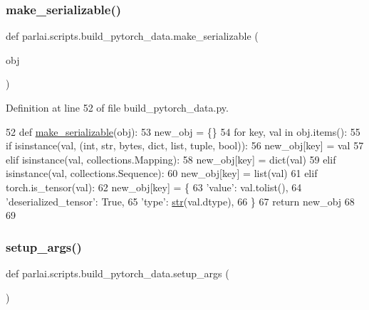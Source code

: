 \subsubsection{\texorpdfstring{make\+\_\+serializable()}{make\_serializable()}}
{\footnotesize\ttfamily def parlai.\+scripts.\+build\+\_\+pytorch\+\_\+data.\+make\+\_\+serializable (\begin{DoxyParamCaption}\item[{}]{obj }\end{DoxyParamCaption})}



Definition at line 52 of file build\+\_\+pytorch\+\_\+data.\+py.


\begin{DoxyCode}
52 \textcolor{keyword}{def }\hyperlink{namespaceparlai_1_1scripts_1_1build__pytorch__data_a1c8f4633b7dc8e990a3e1f6c3e92bd3f}{make\_serializable}(obj):
53     new\_obj = \{\}
54     \textcolor{keywordflow}{for} key, val \textcolor{keywordflow}{in} obj.items():
55         \textcolor{keywordflow}{if} isinstance(val, (int, str, bytes, dict, list, tuple, bool)):
56             new\_obj[key] = val
57         \textcolor{keywordflow}{elif} isinstance(val, collections.Mapping):
58             new\_obj[key] = dict(val)
59         \textcolor{keywordflow}{elif} isinstance(val, collections.Sequence):
60             new\_obj[key] = list(val)
61         \textcolor{keywordflow}{elif} torch.is\_tensor(val):
62             new\_obj[key] = \{
63                 \textcolor{stringliteral}{'value'}: val.tolist(),
64                 \textcolor{stringliteral}{'deserialized\_tensor'}: \textcolor{keyword}{True},
65                 \textcolor{stringliteral}{'type'}: \hyperlink{namespacegenerate__task__READMEs_a5b88452ffb87b78c8c85ececebafc09f}{str}(val.dtype),
66             \}
67     \textcolor{keywordflow}{return} new\_obj
68 
69 
\end{DoxyCode}
\mbox{\label{namespaceparlai_1_1scripts_1_1build__pytorch__data_afd88c85ffdbc233b56542e013352351a}} 
\subsubsection{\texorpdfstring{setup\+\_\+args()}{setup\_args()}}
{\footnotesize\ttfamily def parlai.\+scripts.\+build\+\_\+pytorch\+\_\+data.\+setup\+\_\+args (\begin{DoxyParamCaption}{ }\end{DoxyParamCaption})}



